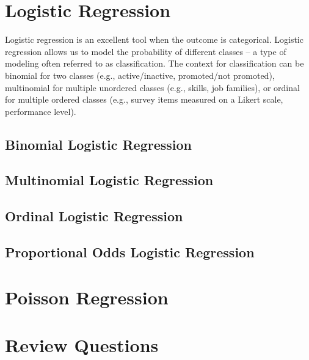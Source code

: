 \documentclass[]{book}
\begin{document}
\hypertarget{logistic-regression}{%
\section{Logistic Regression}\label{logistic-regression}}

Logistic regression is an excellent tool when the outcome is categorical. Logistic regression allows us to model the probability of different classes -- a type of modeling often referred to as classification. The context for classification can be binomial for two classes (e.g., active/inactive, promoted/not promoted), multinomial for multiple unordered classes (e.g., skills, job families), or ordinal for multiple ordered classes (e.g., survey items measured on a Likert scale, performance level).

\hypertarget{binomial-logistic-regression}{%
\subsection{Binomial Logistic Regression}\label{binomial-logistic-regression}}

\hypertarget{multinomial-logistic-regression}{%
\subsection{Multinomial Logistic Regression}\label{multinomial-logistic-regression}}

\hypertarget{ordinal-logistic-regression}{%
\subsection{Ordinal Logistic Regression}\label{ordinal-logistic-regression}}

\hypertarget{proportional-odds-logistic-regression}{%
\subsection{Proportional Odds Logistic Regression}\label{proportional-odds-logistic-regression}}

\hypertarget{poisson-regression}{%
\section{Poisson Regression}\label{poisson-regression}}

\hypertarget{review-questions-8}{%
\section{Review Questions}\label{review-questions-8}}
\end{document}
